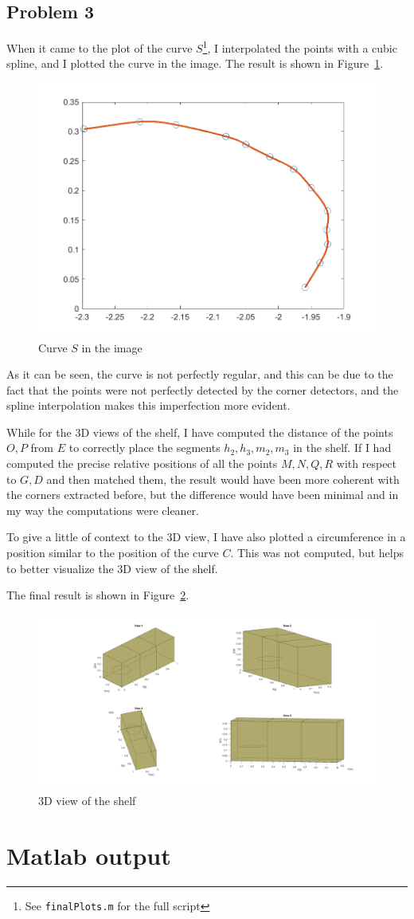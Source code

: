 \documentclass[a4paper, 11pt, oneside, openright, english]{article}
\begin{document}
\subsection{Problem 3}

When it came to the plot of the curve $S$\footnote{See \texttt{finalPlots.m} for the full script}, I interpolated the points with a cubic spline, and I plotted the curve in the image. The result is shown in Figure~\ref{fig:curve_S}.

\begin{figure}[H]
    \centering
    \includegraphics[width=.5\textwidth]{output/rectified_curve_S.png}
    \caption{Curve $S$ in the image}
    \label{fig:curve_S}
\end{figure}

As it can be seen, the curve is not perfectly regular, and this can be due to the fact that the points were not perfectly detected by the corner detectors, and the spline interpolation makes this imperfection more evident.


While for the 3D views of the shelf, I have computed the distance of the points $O,P$ from $E$ to correctly place the segments $h_2,h_3,m_2,m_3$ in the shelf. If I had computed the precise relative positions of all the points $M,N,Q,R$ with respect to $G,D$ and then matched them, the result would have been more coherent with the corners extracted before, but the difference would have been minimal and in my way the computations were cleaner.

To give a little of context to the 3D view, I have also plotted a circumference in a position similar to the position of the curve $C$. This was not computed, but helps to better visualize the 3D view of the shelf.

The final result is shown in Figure~\ref{fig:3D_shelf}.

\begin{figure}[H]
    \centering
    \includegraphics[width=.85\textwidth]{output/final_problem.png}
    \caption{3D view of the shelf}
    \label{fig:3D_shelf}
\end{figure}

\appendix

\section*{Matlab output}
\small{\texttt{}}
\end{document}
